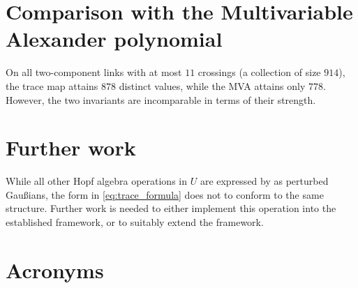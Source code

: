 \documentclass{article}
\begin{document}
\section{Comparison with the Multivariable Alexander polynomial}

On all two-component links with at most $11$ crossings (a collection of size
$914$), the trace map attains $878$ distinct values, while the MVA attains only
$778$. However, the two invariants are incomparable in terms of their strength.

\section{Further work}
While all other Hopf algebra operations in $U$ are expressed by \cite{BV} as
perturbed Gaußians, the form in \cref{eq:trace_formula} does not to conform to
the same structure. Further work is needed to either implement this operation
into the established framework, or to suitably extend the framework.

\section*{Acronyms}
\begin{acronym}
\end{acronym}

\printbibliography
\end{document}
